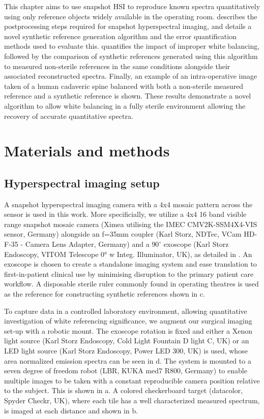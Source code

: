 This chapter aims to use snapshot HSI to reproduce known spectra quantitatively using only reference objects widely available in the operating room.
 describes the postprocessing steps required for snapshot hyperspectral imaging, and details a novel synthetic reference generation algorithm and the error quantification methods used to evaluate this.  quantifies the impact of improper white balancing, followed by the comparison of synthetic references generated using this algorithm to measured non-sterile references in the same conditions alongside their associated reconstructed spectra. Finally, an example of an intra-operative image taken of a human cadaveric spine balanced with both a non-sterile measured reference and a synthetic reference is shown. These results demonstrate a novel algorithm to allow white balancing in a fully sterile environment allowing the recovery of accurate quantitative spectra. 
% 

\section{Materials and methods}
\label{method}

%
\subsection{Hyperspectral imaging setup}
\label{materials}
A snapshot hyperspectral imaging camera with a 4x4 mosaic pattern across the sensor is used in this work.
%
More specificially, we utilize a
4x4 16 band visible range snapshot mosaic camera (Ximea utilising the IMEC CMV2K-SSM4X4-VIS sensor, Germany) alongside an f=35mm coupler (Karl Storz, NDTec, VCam HD-F-35 - Camera Lens Adapter, Germany) and a $90^\circ$ exoscope (Karl Storz Endoscopy, VITOM Telescope 0° w Integ. Illuminator, UK), as detailed in \cite{Ebner2021}. An exoscope is chosen to create a standalone imaging system and ease translation to first-in-patient clinical use by minimising disruption to the primary patient care workflow. A disposable sterile ruler commonly found in operating theatres is used as the reference for constructing synthetic references shown in c.

To capture data in a controlled laboratory environment, allowing quantitative investigation of white referencing significance, we augment our surgical imaging set-up with a robotic mount. The exoscope rotation is fixed and either a Xenon light source (Karl Storz Endoscopy, Cold Light Fountain D light C, UK) or an LED light source (Karl Storz Endoscopy, Power LED 300, UK) is used, whose area normalized emission spectra can be seen in d. The system is mounted to a seven degree of freedom robot (LBR, KUKA med7 R800, Germany) to enable multiple images to be taken with a constant reproducible camera position relative to the subject.
This is shown in a. A colored checkerboard target (datacolor, Spyder Checkr, UK), where each tile has a well characterized measured spectrum, is imaged at each distance and shown in b. 

